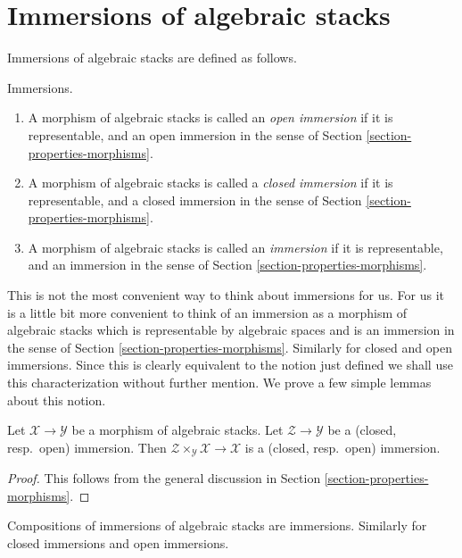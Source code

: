 \section{Immersions of algebraic stacks}
\label{section-immersions}

\noindent
Immersions of algebraic stacks are defined as follows.

\begin{definition}
\label{definition-immersion}
Immersions.
\begin{enumerate}
\item A morphism of algebraic stacks is called an {\it open immersion}
if it is representable, and an open immersion
in the sense of
Section \ref{section-properties-morphisms}.
\item A morphism of algebraic stacks is called a {\it closed immersion}
if it is representable, and a closed immersion
in the sense of
Section \ref{section-properties-morphisms}.
\item A morphism of algebraic stacks is called an {\it immersion}
if it is representable, and an immersion
in the sense of
Section \ref{section-properties-morphisms}.
\end{enumerate}
\end{definition}

\noindent
This is not the most convenient way to think about immersions for us.
For us it is a little bit more convenient to think of an immersion
as a morphism of algebraic stacks which is representable by algebraic
spaces and is an immersion in the sense of
Section \ref{section-properties-morphisms}.
Similarly for closed and open immersions.
Since this is clearly equivalent to the notion just defined we shall
use this characterization without further mention.
We prove a few simple lemmas about this notion.

\begin{lemma}
\label{lemma-base-change-immersion}
Let $\mathcal{X} \to \mathcal{Y}$ be a morphism of algebraic stacks.
Let $\mathcal{Z} \to \mathcal{Y}$ be a
(closed, resp.\ open) immersion.
Then $\mathcal{Z} \times_{\mathcal{Y}} \mathcal{X} \to \mathcal{X}$
is a (closed, resp.\ open) immersion.
\end{lemma}

\begin{proof}
This follows from the general discussion in
Section \ref{section-properties-morphisms}.
\end{proof}

\begin{lemma}
\label{lemma-composition-immersion}
Compositions of immersions of algebraic stacks are immersions.
Similarly for closed immersions and open immersions.
\end{lemma}

